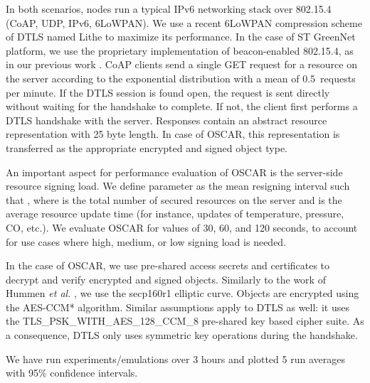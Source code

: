 \documentclass[conference]{IEEEtran}
\begin{document}
In both scenarios, nodes run a typical IPv6 networking stack over 802.15.4
(CoAP, UDP, IPv6, 6LoWPAN). We use a recent 6LoWPAN compression scheme of DTLS
named Lithe \cite{lithe} to maximize its performance. In the case of ST GreenNet platform,
we use the proprietary implementation of beacon-enabled 802.15.4, as in our previous work
 \cite{l2energycost, rpl-topologyconstruction}. CoAP clients send a single
GET request for a resource on the server according to the exponential
distribution with a mean of 0.5~requests per minute. If the DTLS session is
found open, the request is sent directly without waiting for the handshake to
complete. If not, the client first performs a DTLS handshake with the server. Responses contain an abstract resource representation with 25 byte length. In case of OSCAR, this representation is transferred as the appropriate encrypted and signed object type.



An important aspect for performance evaluation of OSCAR is the server-side
resource signing load. We define parameter  as the mean resigning
interval such that , where  is the total number of secured
resources on the server and  is the average resource update time (for
instance, updates of temperature, pressure, CO, etc.). We evaluate OSCAR for
 values of 30, 60, and 120 seconds, to account for use cases where high, medium, or low signing load is needed. 

In the case of OSCAR, we use pre-shared access secrets and certificates to
decrypt and verify encrypted and signed objects. Similarly to the work of Hummen
\emph{et al.} \cite{hummen-certificate}, we use the secp160r1 elliptic
curve. Objects are encrypted using the AES-CCM* algorithm. Similar assumptions
apply to DTLS as well: it uses the TLS\_PSK\_WITH\_AES\_128\_CCM\_8 pre-shared key based cipher suite. As a consequence, DTLS only uses symmetric key operations during the handshake.

We have run experiments/emulations over 3 hours and plotted 5 run averages with 95\% confidence intervals.


\begin{table}[htbp]
\caption{Experiment setup.\label{tab:params}
}
\centering
{}
\label{tab:config}
\end{table}
\end{document}
